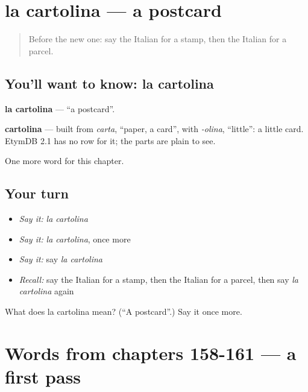 \section[la cartolina]{la cartolina — a postcard}

\label{lesson:IT-C166-cartolina}



\begin{quote}
Before the new one: say the Italian for a stamp, then the Italian for a parcel.
\end{quote}

\subsection*{You'll want to know: la cartolina}
\textbf{la cartolina} — \textquotedblleft{}a postcard\textquotedblright{}.

\begin{cousinweb}
\textbf{cartolina} — built from \emph{carta}, \textquotedblleft{}paper, a card\textquotedblright{}, with \emph{-olina}, \textquotedblleft{}little\textquotedblright{}: a little card. EtymDB 2.1 has no row for it; the parts are plain to see.
\end{cousinweb}

\begin{grammarlens}[title={What you've built}]
One more word for this chapter.
\end{grammarlens}

\subsection*{Your turn}
\begin{itemize}
\raggedright
  \item \emph{Say it:} \emph{la cartolina}
  \item \emph{Say it:} \emph{la cartolina}, once more
  \item \emph{Say it:} say \emph{la cartolina}
  \item \emph{Recall:} say the Italian for a stamp, then the Italian for a parcel, then say \emph{la cartolina} again
\end{itemize}

\begin{tcolorbox}[breakable,colback=teal!4,colframe=teal!35!black,title={Before you move on}]
What does la cartolina mean? (\textquotedblleft{}A postcard\textquotedblright{}.) Say it once more.
\end{tcolorbox}
\section[(dialogue)]{Words from chapters 158-161 — a first pass}

